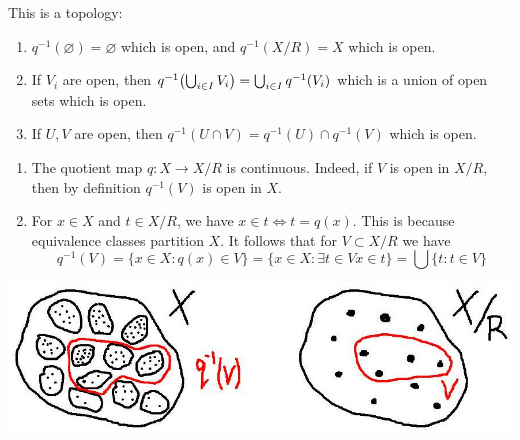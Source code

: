 \documentclass[a4paper,11pt]{article}
\begin{document}
This is a topology:
\begin{enumerate}
    \item \( q^{-1}(\varnothing) = \varnothing \) which is open, and \( q^{-1}(X/R) = X \) which is open.
    \item If \( V_i \) are open, then \( q^{-1}\qty(\bigcup_{i \in I} V_i) = \bigcup_{i \in I} q^{-1}(V_i) \) which is a union of open sets which is open.
    \item If \( U, V \) are open, then \( q^{-1}(U \cap V) = q^{-1}(U) \cap q^{-1}(V) \) which is open.
\end{enumerate}
\begin{remark}
    \begin{enumerate}
        \item The quotient map $q: X \rightarrow X / R$ is continuous. Indeed, if $V$ is open in $X / R$, then by definition $q^{-1}(V)$ is open in $X$.
      
        \item For $x \in X$ and $t \in X / R$, we have $x \in t \Longleftrightarrow t=q(x)$. This is because equivalence classes partition $X$. It follows that for $V \subset X / R$ we have
        $$
        q^{-1}(V)=\{x \in X: q(x) \in V\}=\{x \in X: \exists t \in V x \in t\}=\bigcup\{t: t \in V\}
        $$
      \end{enumerate}
\end{remark}
\begin{center}
    \includegraphics[scale=0.4]{at3.jpg}
\end{center}
\end{document}
